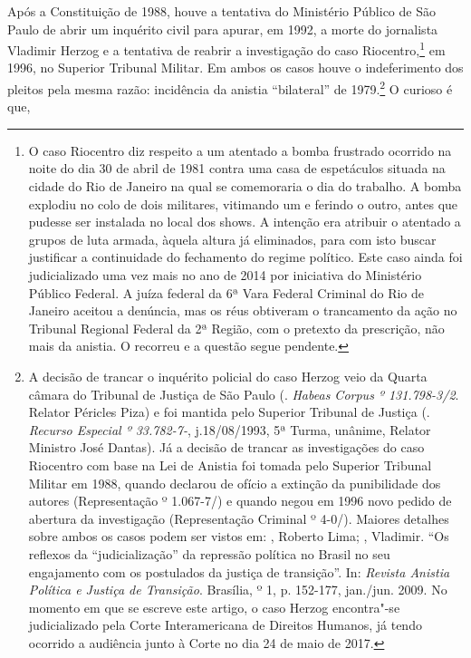 Após a Constituição de 1988, houve a tentativa do Ministério Público de
São Paulo de abrir um inquérito civil para apurar, em 1992, a morte do
jornalista Vladimir Herzog e a tentativa de reabrir a investigação do
caso Riocentro,\footnote{O caso Riocentro diz respeito a um atentado a
  bomba frustrado ocorrido na noite do dia 30 de abril de 1981 contra
  uma casa de espetáculos situada na cidade do Rio de Janeiro na qual se
  comemoraria o dia do trabalho. A bomba explodiu no colo de dois
  militares, vitimando um e ferindo o outro, antes que pudesse ser
  instalada no local dos shows. A intenção era atribuir o atentado a
  grupos de luta armada, àquela altura já eliminados, para com isto
  buscar justificar a continuidade do fechamento do regime político.
  Este caso ainda foi judicializado uma vez mais no ano de 2014 por
  iniciativa do Ministério Público Federal. A juíza federal da 6ª Vara
  Federal Criminal do Rio de Janeiro aceitou a denúncia, mas os réus
  obtiveram o trancamento da ação no Tribunal Regional Federal da 2ª
  Região, com o pretexto da prescrição, não mais da anistia. O 
  recorreu e a questão segue pendente.} em 1996, no Superior Tribunal
Militar. Em ambos os casos houve o indeferimento dos pleitos pela mesma
razão: incidência da anistia ``bilateral'' de 1979.\footnote{A decisão de
  trancar o inquérito policial do caso Herzog veio da Quarta câmara do
  Tribunal de Justiça de São Paulo (.
  \emph{Habeas Corpus º 131.798-3/2}. Relator Péricles Piza) e foi
  mantida pelo Superior Tribunal de Justiça (. \emph{Recurso Especial º 33.782-7-}, j.18/08/1993, 5ª
  Turma, unânime, Relator Ministro José Dantas). Já a decisão de trancar
  as investigações do caso Riocentro com base na Lei de Anistia foi
  tomada pelo Superior Tribunal Militar em 1988, quando declarou de
  ofício a extinção da punibilidade dos autores (Representação º
  1.067-7/) e quando negou em 1996 novo pedido de abertura da
  investigação (Representação Criminal º 4-0/). Maiores detalhes
  sobre ambos os casos podem ser vistos em: , Roberto Lima; 
  , Vladimir. ``Os reflexos da ``judicialização'' da repressão política
  no Brasil no seu engajamento com os postulados da justiça de
  transição''. In: \emph{Revista Anistia Política e Justiça de
  Transição}. Brasília, º 1, p. 152-177, jan./jun. 2009. No momento em
  que se escreve este artigo, o caso Herzog encontra"-se judicializado
  pela Corte Interamericana de Direitos Humanos, já tendo ocorrido a
  audiência junto à Corte no dia 24 de maio de 2017.} O curioso é que,
